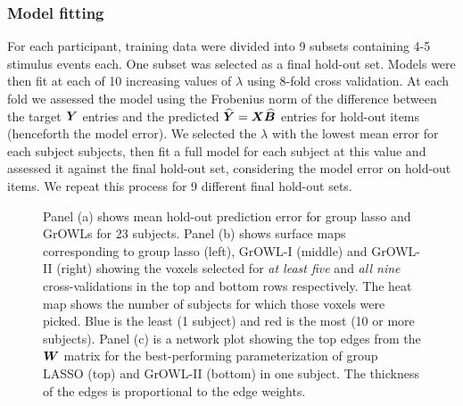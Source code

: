 \subsubsection*{Model fitting}
For each participant, training data were divided into 9 subsets containing 4-5 stimulus
events each. One subset was selected as a final hold-out set. Models were then fit at each
of 10 increasing values of $\lambda$ using 8-fold cross validation. At each fold we
assessed the model using the Frobenius norm of the difference between the target $\boldsymbol{Y}$
entries and the predicted $\boldsymbol{\widehat{Y}} = \boldsymbol{X}\widehat{\boldsymbol{B}}$ entries for hold-out items (henceforth
the model error). We selected the $\lambda$ with the lowest mean error for each subject
subjects, then fit a full model for each subject at this value and assessed it against the
final hold-out set, considering the model error on hold-out items. We repeat this process
for 9 different final hold-out sets.

\begin{figure}[!h]
\centering
{}
\hfil
{}
\hfill
{}
\caption{Panel (a) shows mean hold-out prediction error for group lasso and GrOWLs for 23 subjects. Panel (b) shows surface maps corresponding to group lasso (left), GrOWL-I (middle) and GrOWL-II (right) showing the voxels selected for \textit{at least five} and \textit{all nine} cross-validations in the top and bottom rows respectively. The heat map shows the number of subjects for which those voxels were picked. Blue is the least (1 subject) and red is the most (10 or more subjects). Panel (c) is a network plot showing the top edges from the $\boldsymbol{W}$ matrix for the best-performing parameterization of group LASSO (top) and GrOWL-II (bottom) in one subject. The thickness of the edges is proportional to the edge weights.}
\label{fig.error}
\end{figure}

